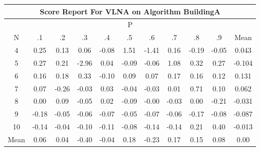 \documentclass[11pt,a4paper]{report}
\begin{document}
\begin{longtable}{ | c || c | c | c | c | c | c | c | c | c || c |}
\hline
\multicolumn{11}{|c|}{ Score Report For VLNA on Algorithm BuildingA} \\
\hline
\multicolumn{11}{|c|}{ P } \\
\hline
N & .1 & .2 & .3 & .4 & .5 & .6 & .7 & .8 & .9 & Mean\\
 \hline
 \hline
 \endhead
  4 &  \cellcolor[HTML]{F7F7FF} 0.25 &  \cellcolor[HTML]{FFFFFF} 0.13 &  \cellcolor[HTML]{FFFFFF} 0.06 &  \cellcolor[HTML]{FFFFFF} -0.08 &  \cellcolor[HTML]{D7D7FF} 1.51 &  \cellcolor[HTML]{FFDFDF} -1.41 &  \cellcolor[HTML]{F7F7FF} 0.16 &  \cellcolor[HTML]{FFF7F7} -0.19 &  \cellcolor[HTML]{FFFFFF} -0.05 & 0.043 \\
  5 &  \cellcolor[HTML]{F7F7FF} 0.27 &  \cellcolor[HTML]{F7F7FF} 0.21 &  \cellcolor[HTML]{FFB7B7} -2.96 &  \cellcolor[HTML]{FFFFFF} 0.04 &  \cellcolor[HTML]{FFFFFF} -0.09 &  \cellcolor[HTML]{FFFFFF} -0.06 &  \cellcolor[HTML]{E7E7FF} 1.08 &  \cellcolor[HTML]{F7F7FF} 0.32 &  \cellcolor[HTML]{F7F7FF} 0.27 & -0.104 \\
  6 &  \cellcolor[HTML]{F7F7FF} 0.16 &  \cellcolor[HTML]{F7F7FF} 0.18 &  \cellcolor[HTML]{F7F7FF} 0.33 &  \cellcolor[HTML]{FFFFFF} -0.10 &  \cellcolor[HTML]{FFFFFF} 0.09 &  \cellcolor[HTML]{FFFFFF} 0.07 &  \cellcolor[HTML]{F7F7FF} 0.17 &  \cellcolor[HTML]{FFFFFF} 0.16 &  \cellcolor[HTML]{FFFFFF} 0.12 & 0.131 \\
  7 &  \cellcolor[HTML]{FFFFFF} 0.07 &  \cellcolor[HTML]{FFF7F7} -0.26 &  \cellcolor[HTML]{FFFFFF} -0.03 &  \cellcolor[HTML]{FFFFFF} 0.03 &  \cellcolor[HTML]{FFFFFF} -0.04 &  \cellcolor[HTML]{FFFFFF} -0.03 &  \cellcolor[HTML]{FFFFFF} 0.01 &  \cellcolor[HTML]{EFEFFF} 0.71 &  \cellcolor[HTML]{FFFFFF} 0.10 & 0.062 \\
  8 &  \cellcolor[HTML]{FFFFFF} 0.00 &  \cellcolor[HTML]{FFFFFF} 0.09 &  \cellcolor[HTML]{FFFFFF} -0.05 &  \cellcolor[HTML]{FFFFFF} 0.02 &  \cellcolor[HTML]{FFFFFF} -0.09 &  \cellcolor[HTML]{FFFFFF} -0.00 &  \cellcolor[HTML]{FFFFFF} -0.03 &  \cellcolor[HTML]{FFFFFF} 0.00 &  \cellcolor[HTML]{FFF7F7} -0.21 & -0.031 \\
  9 &  \cellcolor[HTML]{FFF7F7} -0.18 &  \cellcolor[HTML]{FFFFFF} -0.05 &  \cellcolor[HTML]{FFFFFF} -0.06 &  \cellcolor[HTML]{FFFFFF} -0.07 &  \cellcolor[HTML]{FFFFFF} -0.05 &  \cellcolor[HTML]{FFFFFF} -0.07 &  \cellcolor[HTML]{FFFFFF} -0.06 &  \cellcolor[HTML]{FFF7F7} -0.17 &  \cellcolor[HTML]{FFFFFF} -0.08 & -0.087 \\
  10 &  \cellcolor[HTML]{FFFFFF} -0.14 &  \cellcolor[HTML]{FFFFFF} -0.04 &  \cellcolor[HTML]{FFFFFF} -0.10 &  \cellcolor[HTML]{FFFFFF} -0.11 &  \cellcolor[HTML]{FFFFFF} -0.08 &  \cellcolor[HTML]{FFFFFF} -0.14 &  \cellcolor[HTML]{FFFFFF} -0.14 &  \cellcolor[HTML]{F7F7FF} 0.21 &  \cellcolor[HTML]{F7F7FF} 0.40 & -0.013 \\
 \hline
 \hline
Mean &  \cellcolor[HTML]{FFFFFF} 0.06 &  \cellcolor[HTML]{FFFFFF} 0.04 &  \cellcolor[HTML]{FFF7F7} -0.40 &  \cellcolor[HTML]{FFFFFF} -0.04 &  \cellcolor[HTML]{F7F7FF} 0.18 &  \cellcolor[HTML]{FFF7F7} -0.23 &  \cellcolor[HTML]{F7F7FF} 0.17 &  \cellcolor[HTML]{FFFFFF} 0.15 &  \cellcolor[HTML]{FFFFFF} 0.08 &  \cellcolor[HTML]{FFFFFF} 0.00
\end{longtable}
\end{document}
